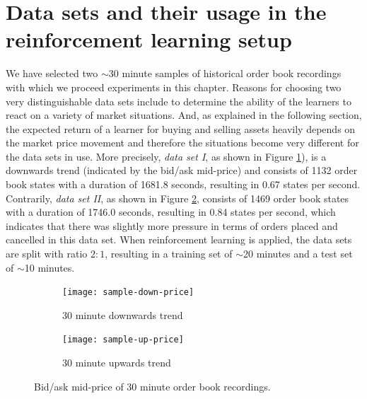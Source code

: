 \section{Data sets and their usage in the reinforcement learning setup}
\label{sec:analysis-data-sets}
We have selected two $\sim$30 minute samples of historical order book recordings with which we proceed experiments in this chapter.
Reasons for choosing two very distinguishable data sets include to determine the ability of the learners to react on a variety of market situations.
And, as explained in the following section, the expected return of a learner for buying and selling assets heavily depends on the market price movement and therefore the situations become very different for the data sets in use.
More precisely, \textit{data set I}, as shown in Figure \ref{fig:sample-down-price}), is a downwards trend (indicated by the bid/ask mid-price) and consists of 1132 order book states with a duration of 1681.8 seconds, resulting in 0.67 states per second.
Contrarily, \textit{data set II}, as shown in Figure \ref{fig:sample-up-price}, consists of 1469 order book states with a duration of 1746.0 seconds, resulting in 0.84 states per second, which indicates that there was slightly more pressure in terms of orders placed and cancelled in this data set.
When reinforcement learning is applied, the data sets are split with ratio $2:1$, resulting in a training set of $\sim$20 minutes and a test set of $\sim$10 minutes.
\begin{figure}[H]
    \centering
    \begin{subfigure}[b]{0.45\textwidth}
        \texttt{[image: sample-down-price]}
        \caption{30 minute downwards trend}
        \label{fig:sample-down-price}
    \end{subfigure}
    \begin{subfigure}[b]{0.45\textwidth}
        \texttt{[image: sample-up-price]}
        \caption{30 minute upwards trend}
        \label{fig:sample-up-price}
    \end{subfigure}
    \caption{Bid/ask mid-price of 30 minute order book recordings.}
    \label{fig:sample-price}
\end{figure}

